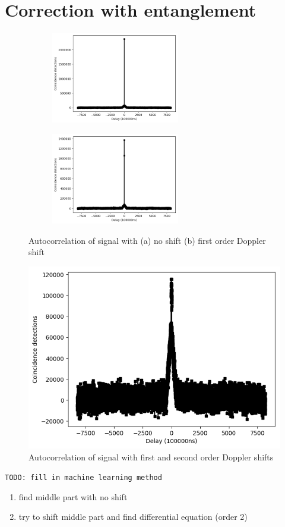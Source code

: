 \section{Correction with entanglement}

\begin{figure}[ht!]
	\centering
	\begin{subfigure}[t]{0.49\linewidth}
		\centering
		\includegraphics[height=4cm]{assets/unshifted_cc.png}
		\subcaption{}
	\end{subfigure}
	\begin{subfigure}[t]{0.49\textwidth}
		\centering
		\includegraphics[height=4cm]{assets/firstDoppler_cc.png}
		\subcaption{}
	\end{subfigure}
	\caption{Autocorrelation of signal with (a) no shift (b) first order Doppler shift}
	\label{fig:firstDoppler_cc}
\end{figure}
\begin{figure}[ht!]
	\centering
	\includegraphics[width=0.95\linewidth]{assets/secondDoppler_cc.png}
	\caption{Autocorrelation of signal with first and second order Doppler shifts}
	\label{fig:secondDoppler_cc}
\end{figure}

\texttt{TODO: fill in machine learning method}

\begin{enumerate}
	\item find middle part with no shift
	\item try to shift middle part and find differential equation (order 2)
\end{enumerate}
 